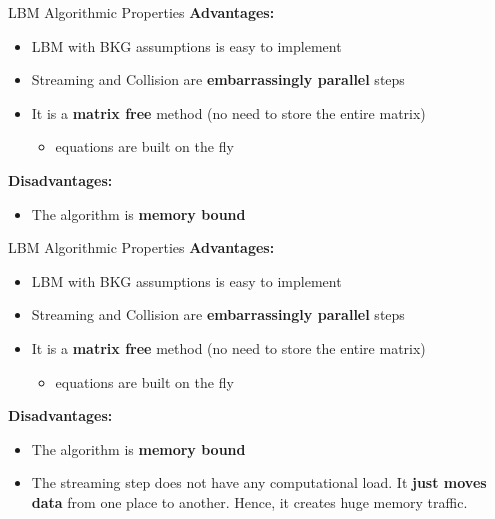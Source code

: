 \documentclass[9pt]{beamer}
\newcommand{\emphasize}[1]{\textbf{\color{red} #1 } }
\begin{document}
\begin{frame}[t]{LBM Algorithmic Properties}
\emphasize{Advantages:}
\begin{itemize}
\item LBM with BKG assumptions is easy to implement
\item Streaming and Collision are \textbf{embarrassingly parallel} steps
\item It is a \textbf{matrix free} method (no need to store the entire matrix)
\begin{itemize}
	\item equations are built on the fly
\end{itemize}

\end{itemize}
\emphasize{Disadvantages:}
\begin{itemize}
\item The algorithm is \textbf{memory bound}
\end{itemize}
\end{frame}


\begin{frame}[t]{LBM Algorithmic Properties}
\emphasize{Advantages:}
\begin{itemize}
\item LBM with BKG assumptions is easy to implement
\item Streaming and Collision are \textbf{embarrassingly parallel} steps
\item It is a \textbf{matrix free} method (no need to store the entire matrix)
\begin{itemize}
	\item equations are built on the fly
\end{itemize}

\end{itemize}
\emphasize{Disadvantages:}
\begin{itemize}
\item The algorithm is \textbf{memory bound}
\item The streaming step does not have any computational load. It \textbf{just moves data} from one place to another. Hence, it creates huge memory traffic.
\end{itemize}
\end{frame}
\end{document}

